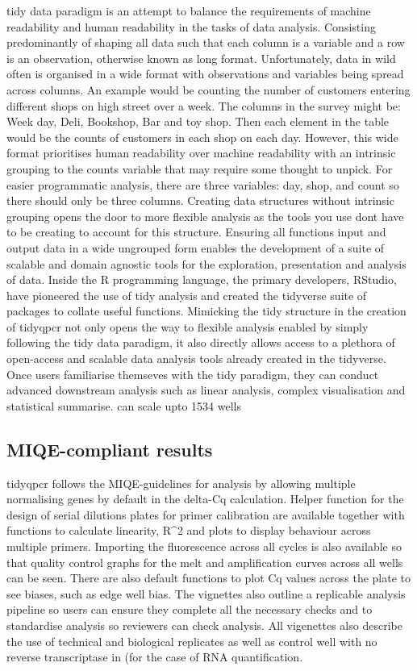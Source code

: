 \documentclass{SBCbookchapter}
\begin{document}
tidy data paradigm is an attempt to balance the requirements of machine readability and human readability in the tasks of data analysis. Consisting predominantly of shaping all data such that each column is a variable and a row is an observation, otherwise known as long format. Unfortunately, data in wild often is organised in a wide format with observations and variables being spread across columns. An example would be counting the number of customers entering different shops on high street over a week. The columns in the survey might be: Week day, Deli, Bookshop, Bar and toy shop. Then each element in the table would be the counts of customers in each shop on each day. However, this wide format prioritises human readability over machine readability with an intrinsic grouping to the counts variable that may require some thought to unpick. For easier programmatic analysis, there are three variables: day, shop, and count so there should only be three columns. Creating data structures without intrinsic grouping opens the door to more flexible analysis as the tools you use dont have to be creating to account for this structure. Ensuring all functions input and output data in a wide ungrouped form enables the development of a suite of scalable and domain agnostic tools for the exploration, presentation and analysis of data. Inside the R programming language, the primary developers, RStudio, have pioneered the use of tidy analysis and created the tidyverse suite of packages to collate useful functions. Mimicking the tidy structure in the creation of tidyqpcr not only opens the way to flexible analysis enabled by simply following the tidy data paradigm, it also directly allows access to a plethora of open-access and scalable data analysis tools already created in the tidyverse. Once users familiarise themseves with the tidy paradigm, they can conduct advanced downstream analysis such as linear analysis, complex visualisation and statistical summarise. can scale upto 1534 wells 

\subsection{MIQE-compliant results}

tidyqpcr follows the MIQE-guidelines for analysis by allowing multiple normalising genes by default in the delta-Cq calculation. 
Helper function for the design of serial dilutions plates for primer calibration are available together with functions to calculate linearity, R^2 and plots to display behaviour across multiple primers.
Importing the fluorescence across all cycles is also available so that quality control graphs for the melt and amplification curves across all wells can be seen.
There are also default functions to plot Cq values across the plate to see biases, such as edge well bias. 
The vignettes also outline a replicable analysis pipeline so users can ensure they complete all the necessary checks and to standardise analysis so reviewers can check analysis.
All vigenettes also describe the use of technical and biological replicates as well as control well with no reverse transcriptase in (for the case of RNA quantification.
\end{document}

